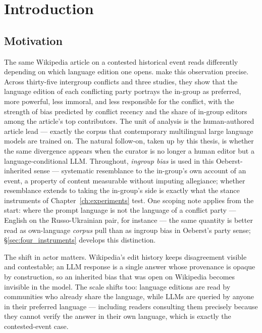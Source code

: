 \chapter{Introduction}\label{ch:introduction}

\section{Motivation}\label{sec:motivation}

The same Wikipedia article on a contested historical event reads
differently depending on which language edition one opens.
\citet{oeberst2020wikipedia} make this observation precise. Across
thirty-five intergroup conflicts and three studies, they show that
the language edition of each conflicting party portrays the
in-group as preferred, more powerful, less immoral, and less
responsible for the conflict, with the strength of bias predicted
by conflict recency and the share of in-group editors among the
article's top contributors. The unit of analysis is the
human-authored article lead --- exactly the corpus that
contemporary multilingual large language models are trained on.
The natural follow-on, taken up by this thesis, is whether the
same divergence appears when the curator is no longer a human
editor but a language-conditional LLM. Throughout, \emph{ingroup
bias} is used in this Oeberst-inherited sense --- systematic
resemblance to the in-group's own account of an event, a property
of content measurable without imputing allegiance; whether
resemblance extends to taking the in-group's side is exactly what
the stance instruments of Chapter~\ref{ch:experiments} test. One
scoping note applies from the start: where the prompt language is
not the language of a conflict party --- English on the
Russo-Ukrainian pair, for instance --- the same quantity is better
read as own-language \emph{corpus} pull than as ingroup bias in
Oeberst's party sense; \S\ref{sec:four_instruments} develops this
distinction.

The shift in actor matters. Wikipedia's edit history keeps
disagreement visible and contestable; an LLM response is a single
answer whose provenance is opaque by construction, so an inherited
bias that was open on Wikipedia becomes invisible in the model. The
scale shifts too: language editions are read by communities who
already share the language, while LLMs are queried by anyone in
their preferred language --- including readers consulting them
precisely because they cannot verify the answer in their own
language, which is exactly the contested-event case.

